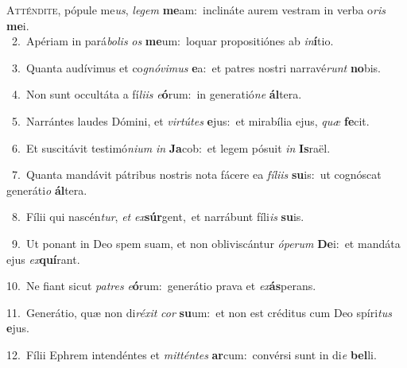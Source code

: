 \lettrine{\initial\textcolor{\initialcolor}{A}}{tténdite,} pópule me\-\textit{us}\-, \textit{le}\-\textit{gem} \textbf{me}\-am:~\star inclináte aurem vestram in verba o\textit{ris} \textbf{me}\-i.\\
{\numbfont\textcolor{\numbcolor}{~2.}}~Apériam in pará\-\textit{bo}\-\textit{lis} \textit{os} \textbf{me}\-um:~\star loquar propositiónes ab \textit{in}\-\textbf{í}tio.\par
{\numbfont\textcolor{\numbcolor}{~3.}}~Quanta audívimus et co\-\textit{gnó}\-\textit{vi}\textit{mus} \textbf{e}\-a:~\star et patres nostri narravé\textit{runt} \textbf{no}\-bis.\par
{\numbfont\textcolor{\numbcolor}{~4.}}~Non sunt occultáta a fí\-\textit{li}\-\textit{is} \textit{e}\-\textbf{ó}rum:~\star in generatió\textit{ne} \textbf{ál}\-tera.\par
{\numbfont\textcolor{\numbcolor}{~5.}}~Narrántes laudes Dómini, et \textit{vir}\-\textit{tú}\textit{tes} \textbf{e}\-jus:~\star et mirabília ejus, \textit{quæ} \textbf{fe}\-cit.\par
{\numbfont\textcolor{\numbcolor}{~6.}}~Et suscitávit testimó\-\textit{ni}\-\textit{um} \textit{in} \textbf{Ja}\-cob:~\star et legem pósuit \textit{in} \textbf{Is}\-raël.\par
{\numbfont\textcolor{\numbcolor}{~7.}}~Quanta mandávit pátribus nostris nota fácere ea \textit{fí}\-\textit{li}\textit{is} \textbf{su}\-is:~\star ut cognóscat generáti\textit{o} \textbf{ál}\-tera.\par
{\numbfont\textcolor{\numbcolor}{~8.}}~Fílii qui nascén\-\textit{tur}\-, \textit{et} \textit{ex}\-\textbf{súr}gent,~\star et narrábunt fíli\textit{is} \textbf{su}\-is.\par
{\numbfont\textcolor{\numbcolor}{~9.}}~Ut ponant in Deo spem suam, et non obliviscántur \textit{ó}\-\textit{pe}\textit{rum} \textbf{De}\-i:~\star et mandáta ejus \textit{ex}\-\textbf{quí}rant.\par
{\numbfont\textcolor{\numbcolor}{10.}}~Ne fiant sicut \textit{pa}\-\textit{tres} \textit{e}\-\textbf{ó}rum:~\star generátio prava et \textit{ex}\-\textbf{ás}perans.\par
{\numbfont\textcolor{\numbcolor}{11.}}~Generátio, quæ non di\-\textit{ré}\-\textit{xit} \textit{cor} \textbf{su}\-um:~\star et non est créditus cum Deo spíri\textit{tus} \textbf{e}\-jus.\par
{\numbfont\textcolor{\numbcolor}{12.}}~Fílii Ephrem intendéntes et \textit{mit}\-\textit{tén}\textit{tes} \textbf{ar}\-cum:~\star convérsi sunt in di\textit{e} \textbf{bel}\-li.\par
